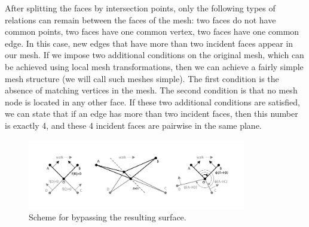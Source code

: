 \documentclass[
11pt,%
tightenlines,%
twoside,%
onecolumn,%
nofloats,%
nobibnotes,%
nofootinbib,%
superscriptaddress,%
noshowpacs,%
centertags]%
{revtex4-2}
\begin{document}
After splitting the faces by intersection points, only the following types of relations can remain between the faces of the mesh: two faces do not have common points, two faces have one common vertex, two faces have one common edge.
In this case, new edges that have more than two incident faces appear in our mesh.
If we impose two additional conditions on the original mesh, which can be achieved using local mesh transformations, then we can achieve a fairly simple mesh structure (we will call such meshes simple).
The first condition is the absence of matching vertices in the mesh.
The second condition is that no mesh node is located in any other face.
If these two additional conditions are satisfied, we can state that if an edge has more than two incident faces, then this number is exactly 4, and these 4 incident faces are pairwise in the same plane.

\begin{figure}[h]
\includegraphics[width=0.85\textwidth]{pics/pic_walk_1_size.pdf}
\caption{Scheme for bypassing the resulting surface.}\label{fig:pic_walk}
\end{figure}
\end{document}
